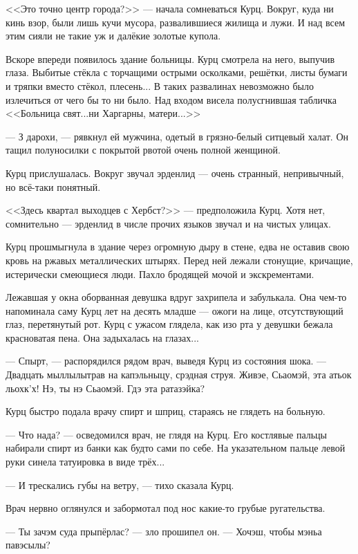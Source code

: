 <<Это точно центр города?>> --- начала сомневаться Курц.
Вокруг, куда ни кинь взор, были лишь кучи мусора, развалившиеся жилища и лужи.
И над всем этим сияли не такие уж и далёкие золотые купола.

Вскоре впереди появилось здание больницы.
Курц смотрела на него, выпучив глаза.
Выбитые стёкла с торчащими острыми осколками, решётки, листы бумаги и тряпки вместо стёкол, плесень...
В таких развалинах невозможно было излечиться от чего бы то ни было.
Над входом висела полусгнившая табличка <<Больница свят...ни Харгарны, матери...>>

--- З дарохи, --- рявкнул ей мужчина, одетый в грязно-белый ситцевый халат.
Он тащил полуносилки с покрытой рвотой очень полной женщиной.

Курц прислушалась.
Вокруг звучал эрденлид --- очень странный, непривычный, но всё-таки понятный.

<<Здесь квартал выходцев с Хербст?>> --- предположила Курц.
Хотя нет, сомнительно --- эрденлид в числе прочих языков звучал и на чистых улицах.

Курц прошмыгнула в здание через огромную дыру в стене, едва не оставив свою кровь на ржавых металлических штырях.
Перед ней лежали стонущие, кричащие, истерически смеющиеся люди.
Пахло бродящей мочой и экскрементами.

Лежавшая у окна оборванная девушка вдруг захрипела и забулькала.
Она чем-то напоминала саму Курц лет на десять младше --- ожоги на лице, отсутствующий глаз, перетянутый рот.
Курц с ужасом глядела, как изо рта у девушки бежала красноватая пена.
Она задыхалась на глазах...

--- Спырт, --- распорядился рядом врач, выведя Курц из состояния шока.
--- Двадцать мыллылытрав на капэльныцу, срэдная струя.
Живэе, Сьаомэй, эта атьок льохк'х!
Нэ, ты нэ Сьаомэй.
Гдэ эта ратазэйка?

Курц быстро подала врачу спирт и шприц, стараясь не глядеть на больную.

--- Что нада? --- осведомился врач, не глядя на Курц.
Его костлявые пальцы набирали спирт из банки как будто сами по себе.
На указательном пальце левой руки синела татуировка в виде трёх...

--- И трескались губы на ветру, --- тихо сказала Курц.

Врач нервно оглянулся и забормотал под нос какие-то грубые ругательства.

--- Ты зачэм суда прыпёрлас? --- зло прошипел он. --- Хочэш, чтобы мэньа павэсылы?

